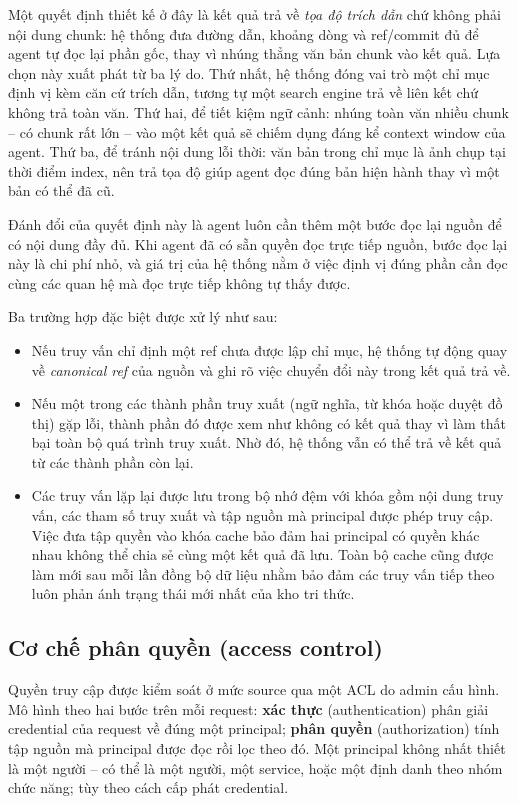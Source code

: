 Một quyết định thiết kế ở đây là kết quả trả về \textit{tọa độ trích dẫn} chứ không phải nội dung chunk: hệ thống đưa đường dẫn, khoảng dòng và ref/commit đủ để agent tự đọc lại phần gốc, thay vì nhúng thẳng văn bản chunk vào kết quả. Lựa chọn này xuất phát từ ba lý do. Thứ nhất, hệ thống đóng vai trò một chỉ mục định vị kèm căn cứ trích dẫn, tương tự một search engine trả về liên kết chứ không trả toàn văn. Thứ hai, để tiết kiệm ngữ cảnh: nhúng toàn văn nhiều chunk -- có chunk rất lớn -- vào một kết quả sẽ chiếm dụng đáng kể context window của agent. Thứ ba, để tránh nội dung lỗi thời: văn bản trong chỉ mục là ảnh chụp tại thời điểm index, nên trả tọa độ giúp agent đọc đúng bản hiện hành thay vì một bản có thể đã cũ.

Đánh đổi của quyết định này là agent luôn cần thêm một bước đọc lại nguồn để có nội dung đầy đủ. Khi agent đã có sẵn quyền đọc trực tiếp nguồn, bước đọc lại này là chi phí nhỏ, và giá trị của hệ thống nằm ở việc định vị đúng phần cần đọc cùng các quan hệ mà đọc trực tiếp không tự thấy được.

Ba trường hợp đặc biệt được xử lý như sau:

\begin{itemize}
  \item Nếu truy vấn chỉ định một ref chưa được lập chỉ mục, hệ thống tự động quay về \textit{canonical ref} của nguồn và ghi rõ việc chuyển đổi này trong kết quả trả về.
  \item Nếu một trong các thành phần truy xuất (ngữ nghĩa, từ khóa hoặc duyệt đồ thị) gặp lỗi, thành phần đó được xem như không có kết quả thay vì làm thất bại toàn bộ quá trình truy xuất. Nhờ đó, hệ thống vẫn có thể trả về kết quả từ các thành phần còn lại.
  \item Các truy vấn lặp lại được lưu trong bộ nhớ đệm với khóa gồm nội dung truy vấn, các tham số truy xuất và tập nguồn mà principal được phép truy cập. Việc đưa tập quyền vào khóa cache bảo đảm hai principal có quyền khác nhau không thể chia sẻ cùng một kết quả đã lưu. Toàn bộ cache cũng được làm mới sau mỗi lần đồng bộ dữ liệu nhằm bảo đảm các truy vấn tiếp theo luôn phản ánh trạng thái mới nhất của kho tri thức.
\end{itemize}

\subsection{Cơ chế phân quyền (access control)}

Quyền truy cập được kiểm soát ở mức source qua một ACL do admin cấu hình. Mô hình theo hai bước trên mỗi request: \textbf{xác thực} (authentication) phân giải credential của request về đúng một principal; \textbf{phân quyền} (authorization) tính tập nguồn mà principal được đọc rồi lọc theo đó. Một principal không nhất thiết là một người -- có thể là một người, một service, hoặc một định danh theo nhóm chức năng; tùy theo cách cấp phát credential.


